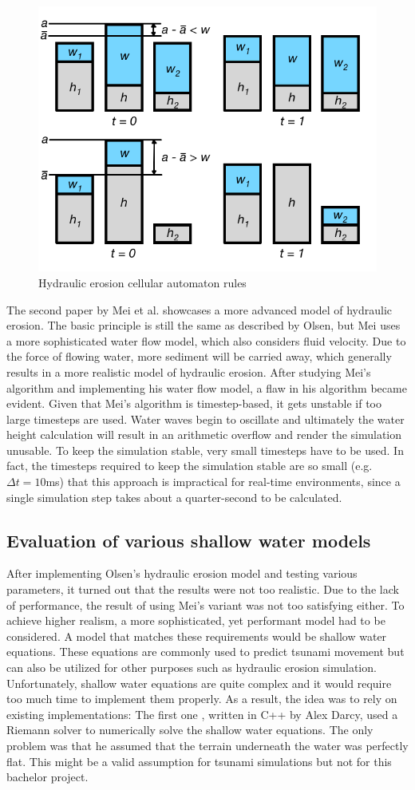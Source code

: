 \documentclass[11pt,a4paper,twoside,openright]{report}
\begin{document}
\begin{figure}[H]
\centering
\includegraphics[width=0.5\linewidth]{hydraulicerosion.png}
\caption{Hydraulic erosion cellular automaton rules}\label{fig:hydrolicerosion}
\end{figure}

\noindent The second paper \cite{mei:inria-00402079} by Mei et al. showcases a more advanced model of hydraulic erosion. The basic principle is still the same as described by Olsen, but Mei uses a more sophisticated water flow model, which also considers fluid velocity. Due to the force of flowing water, more sediment will be carried away, which generally results in a more realistic model of hydraulic erosion. After studying Mei's algorithm and implementing his water flow model, a flaw in his algorithm became evident. Given that Mei's algorithm is timestep-based, it gets unstable if too large timesteps are used. Water waves begin to oscillate and ultimately the water height calculation will result in an arithmetic overflow and render the simulation unusable. To keep the simulation stable, very small timesteps have to be used. In fact, the timesteps required to keep the simulation stable are so small (e.g. $\Delta t = 10$ms) that this approach is impractical for real-time environments, since a single simulation step takes about a quarter-second to be calculated.

\subsection{Evaluation of various shallow water models}
After implementing Olsen's hydraulic erosion model and testing various parameters, it turned out that the results were not too realistic. Due to the lack of performance, the result of using Mei's variant was not too satisfying either. To achieve higher realism, a more sophisticated, yet performant model had to be considered. A model that matches these requirements would be shallow water equations. These equations are commonly used to predict tsunami movement but can also be utilized for other purposes such as hydraulic erosion simulation. Unfortunately, shallow water equations are quite complex and it would require too much time to implement them properly. As a result, the idea was to rely on existing implementations: The first one \cite{Darcy}, written in C++ by Alex Darcy, used a Riemann solver to numerically solve the shallow water equations. The only problem was that he assumed that the terrain underneath the water was perfectly flat. This might be a valid assumption for tsunami simulations but not for this bachelor project.
\end{document}
